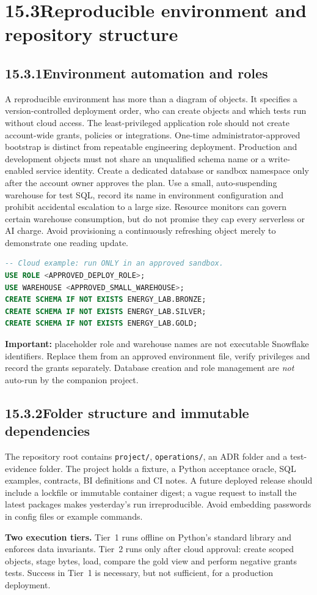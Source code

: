 \documentclass[11pt,twoside]{article}
\newcommand{\topic}[2]{\subsection*{#1\quad #2}}
\begin{document}
\newpage

\section*{15.3\quad Reproducible environment and repository structure}
\topic{15.3.1}{Environment automation and roles}
A reproducible environment has more than a diagram of objects. It specifies a version-controlled deployment order, who can create objects and which tests run without cloud access. The least-privileged application role should not create account-wide grants, policies or integrations. One-time administrator-approved bootstrap is distinct from repeatable engineering deployment. Production and development objects must not share an unqualified schema name or a write-enabled service identity.
Create a dedicated database or sandbox namespace only after the account owner approves the plan. Use a small, auto-suspending warehouse for test SQL, record its name in environment configuration and prohibit accidental escalation to a large size. Resource monitors can govern certain warehouse consumption, but do not promise they cap every serverless or AI charge. Avoid provisioning a continuously refreshing object merely to demonstrate one reading update.
\begin{lstlisting}[language=SQL]
-- Cloud example: run ONLY in an approved sandbox.
USE ROLE <APPROVED_DEPLOY_ROLE>;
USE WAREHOUSE <APPROVED_SMALL_WAREHOUSE>;
CREATE SCHEMA IF NOT EXISTS ENERGY_LAB.BRONZE;
CREATE SCHEMA IF NOT EXISTS ENERGY_LAB.SILVER;
CREATE SCHEMA IF NOT EXISTS ENERGY_LAB.GOLD;
\end{lstlisting}
\textbf{Important:} placeholder role and warehouse names are not executable Snowflake identifiers. Replace them from an approved environment file, verify privileges and record the grants separately. Database creation and role management are \emph{not} auto-run by the companion project.
\topic{15.3.2}{Folder structure and immutable dependencies}
The repository root contains \texttt{project/}, \texttt{operations/}, an ADR folder and a test-evidence folder. The project holds a fixture, a Python acceptance oracle, SQL examples, contracts, BI definitions and CI notes. A future deployed release should include a lockfile or immutable container digest; a vague request to install the latest packages makes yesterday's run irreproducible. Avoid embedding passwords in config files or example commands.
\begin{insight}\textbf{Two execution tiers.} Tier~1 runs offline on Python's standard library and enforces data invariants. Tier~2 runs only after cloud approval: create scoped objects, stage bytes, load, compare the gold view and perform negative grants tests. Success in Tier~1 is necessary, but not sufficient, for a production deployment.\end{insight}
\end{document}
